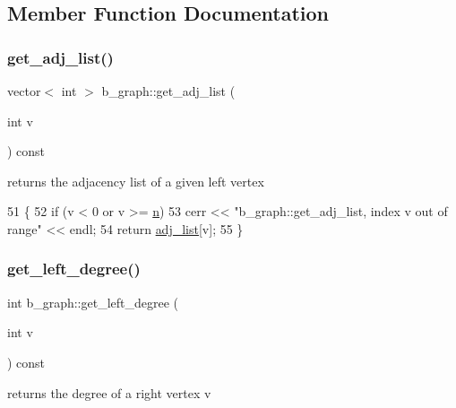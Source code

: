\subsection{Member Function Documentation}
\mbox{\label{classb__graph_aa81c7179b9c6cb4986c4b41e84a85799}} 
\subsubsection{\texorpdfstring{get\+\_\+adj\+\_\+list()}{get\_adj\_list()}}
{\footnotesize\ttfamily vector$<$ int $>$ b\+\_\+graph\+::get\+\_\+adj\+\_\+list (\begin{DoxyParamCaption}\item[{int}]{v }\end{DoxyParamCaption}) const}



returns the adjacency list of a given left vertex 


\begin{DoxyCode}
51 \{
52   \textcolor{keywordflow}{if} (v < 0 or v >= \hyperlink{classb__graph_a9e211d40c1799bc9b125de472ff06642}{n})
53     cerr << \textcolor{stringliteral}{"b\_graph::get\_adj\_list, index v out of range"} << endl;
54   \textcolor{keywordflow}{return} \hyperlink{classb__graph_a2a89d2e8f958270952aab2e8769b7342}{adj\_list}[v];
55 \}
\end{DoxyCode}
\mbox{\label{classb__graph_ac64ac5cb1197d8008e07babc333eb3ea}} 
\subsubsection{\texorpdfstring{get\+\_\+left\+\_\+degree()}{get\_left\_degree()}}
{\footnotesize\ttfamily int b\+\_\+graph\+::get\+\_\+left\+\_\+degree (\begin{DoxyParamCaption}\item[{int}]{v }\end{DoxyParamCaption}) const}



returns the degree of a right vertex v 


